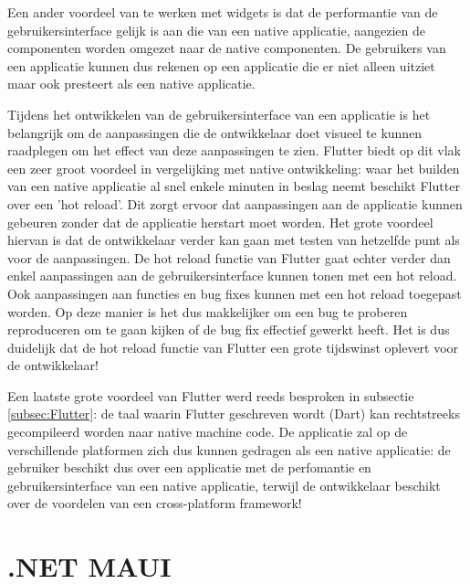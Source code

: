 Een ander voordeel van te werken met widgets is dat de performantie van de gebruikersinterface gelijk is aan die van een native applicatie, aangezien de componenten worden omgezet naar de native componenten. De gebruikers van een applicatie kunnen dus rekenen op een applicatie die er niet alleen uitziet maar ook presteert als een native applicatie.

Tijdens het ontwikkelen van de gebruikersinterface van een applicatie is het belangrijk om de aanpassingen die de ontwikkelaar doet visueel te kunnen raadplegen om het effect van deze aanpassingen te zien. Flutter biedt op dit vlak een zeer groot voordeel in vergelijking met native ontwikkeling: waar het builden van een native applicatie al snel enkele minuten in beslag neemt beschikt Flutter over een 'hot reload'. Dit zorgt ervoor dat aanpassingen aan de applicatie kunnen gebeuren zonder dat de applicatie herstart moet worden. Het grote voordeel hiervan is dat de ontwikkelaar verder kan gaan met testen van hetzelfde punt als voor de aanpassingen. De hot reload functie van Flutter gaat echter verder dan enkel aanpassingen aan de gebruikersinterface kunnen tonen met een hot reload. Ook aanpassingen aan functies en bug fixes kunnen met een hot reload toegepast worden. Op deze manier is het dus makkelijker om een bug te proberen reproduceren om te gaan kijken of de bug fix effectief gewerkt heeft. Het is dus duidelijk dat de hot reload functie van Flutter een grote tijdswinst oplevert voor de ontwikkelaar!

Een laatste grote voordeel van Flutter werd reeds besproken in subsectie \ref{subsec:Flutter}: de taal waarin Flutter geschreven wordt (Dart) kan rechtstreeks gecompileerd worden naar native machine code. De applicatie zal op de verschillende platformen zich dus kunnen gedragen als een native applicatie: de gebruiker beschikt dus over een applicatie met de perfomantie en gebruikersinterface van een native applicatie, terwijl de ontwikkelaar beschikt over de voordelen van een cross-platform framework!

\section{.NET MAUI}
\label{detailsdotnetMAUI}




